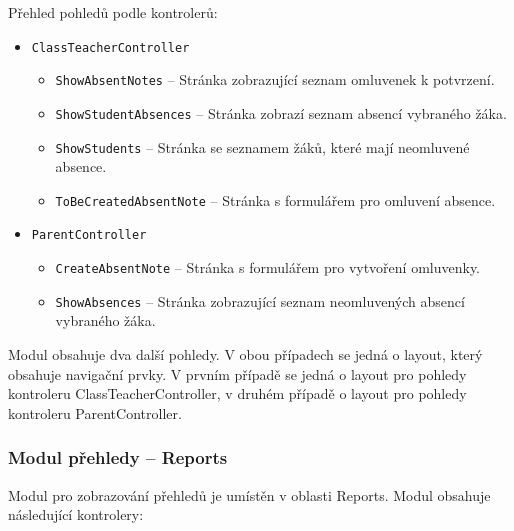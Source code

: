 Přehled pohledů podle kontrolerů:

\begin{itemize}
    \item \texttt{ClassTeacherController}
    \begin{itemize}
        \item \texttt{ShowAbsentNotes} -- Stránka zobrazující seznam omluvenek k potvrzení.
        \item \texttt{ShowStudentAbsences} -- Stránka zobrazí seznam absencí vybraného žáka.
        \item \texttt{ShowStudents} -- Stránka se seznamem žáků, které mají neomluvené absence.
        \item \texttt{ToBeCreatedAbsentNote} -- Stránka s formulářem pro omluvení absence.
    \end{itemize}
    
    \item \texttt{ParentController}
    \begin{itemize}
        \item \texttt{CreateAbsentNote} -- Stránka s formulářem pro vytvoření omluvenky.
        \item \texttt{ShowAbsences} -- Stránka zobrazující seznam neomluvených absencí vybraného žáka.
    \end{itemize}
\end{itemize}

Modul obsahuje dva další pohledy. V obou případech se jedná o layout, který obsahuje navigační prvky. V prvním případě se jedná o layout pro pohledy kontroleru ClassTeacherController, v druhém případě o layout pro pohledy kontroleru ParentController.


\subsubsection{Modul přehledy -- Reports}
Modul pro zobrazování přehledů je umístěn v oblasti Reports. Modul obsahuje následující kontrolery:


